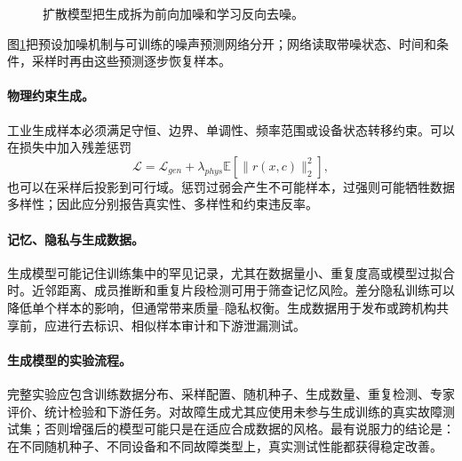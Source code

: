 \begin{figure}[htbp]
\centering
{}
\caption{扩散模型把生成拆为前向加噪和学习反向去噪。}
\label{fig:generative-denoising-network}
\end{figure}
图\ref{fig:generative-denoising-network}把预设加噪机制与可训练的噪声预测网络分开；网络读取带噪状态、时间和条件，采样时再由这些预测逐步恢复样本。

\paragraph{物理约束生成。}
工业生成样本必须满足守恒、边界、单调性、频率范围或设备状态转移约束。可以在损失中加入残差惩罚
\begin{equation}
 \mathcal{L}=\mathcal{L}_{gen}+\lambda_{phys}\mathbb{E}[\|r(x,c)\|_2^2],
\end{equation}
也可以在采样后投影到可行域。惩罚过弱会产生不可能样本，过强则可能牺牲数据多样性；因此应分别报告真实性、多样性和约束违反率。

\paragraph{记忆、隐私与生成数据。}
生成模型可能记住训练集中的罕见记录，尤其在数据量小、重复度高或模型过拟合时。近邻距离、成员推断和重复片段检测可用于筛查记忆风险。差分隐私训练可以降低单个样本的影响，但通常带来质量--隐私权衡。生成数据用于发布或跨机构共享前，应进行去标识、相似样本审计和下游泄漏测试。

\paragraph{生成模型的实验流程。}
完整实验应包含训练数据分布、采样配置、随机种子、生成数量、重复检测、专家评价、统计检验和下游任务。对故障生成尤其应使用未参与生成训练的真实故障测试集；否则增强后的模型可能只是在适应合成数据的风格。最有说服力的结论是：在不同随机种子、不同设备和不同故障类型上，真实测试性能都获得稳定改善。

